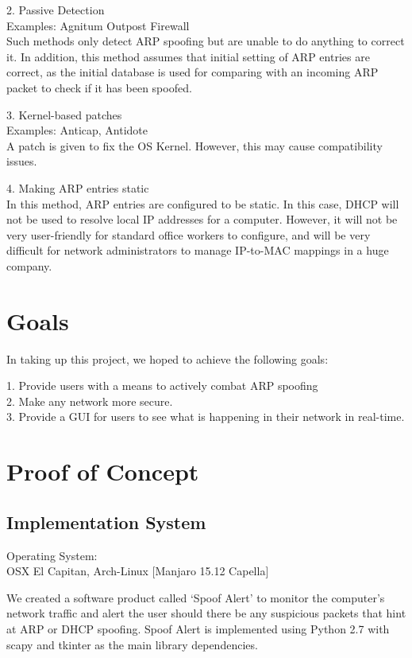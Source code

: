 \documentclass{acm_proc_article-sp}
\begin{document}
2. Passive Detection \\
Examples: Agnitum Outpost Firewall\\
Such methods only detect ARP spoofing but are unable to do anything to correct it. In addition, this method assumes that initial setting of ARP entries are correct, as the initial database is used for comparing with an incoming ARP packet to check if it has been spoofed. 

3. Kernel-based patches\\
Examples: Anticap, Antidote \\
A patch is given to fix the OS Kernel. However, this may cause compatibility issues. 

4. Making ARP entries static\\ 
In this method, ARP entries are configured to be static. In this case, DHCP will not be used to resolve local IP addresses for a computer. However, it will not be very user-friendly for standard office workers to configure, and will be very difficult for network administrators to manage IP-to-MAC mappings in a huge company. 


\section{Goals}
In taking up this project, we hoped to achieve the following goals: 

1. Provide users with a means to actively combat ARP spoofing \\
2. Make any network more secure. \\
3. Provide a GUI for users to see what is happening in their network in real-time. 

\section{Proof of Concept}
\subsection{Implementation System}
Operating System: \\
OSX El Capitan, Arch-Linux [Manjaro 15.12 Capella]

We created a software product called `Spoof Alert' to monitor the computer's network traffic and alert the user should there be any suspicious packets that hint at ARP or DHCP spoofing. Spoof Alert is implemented using Python 2.7 with scapy and tkinter as the main library dependencies.
\end{document}

